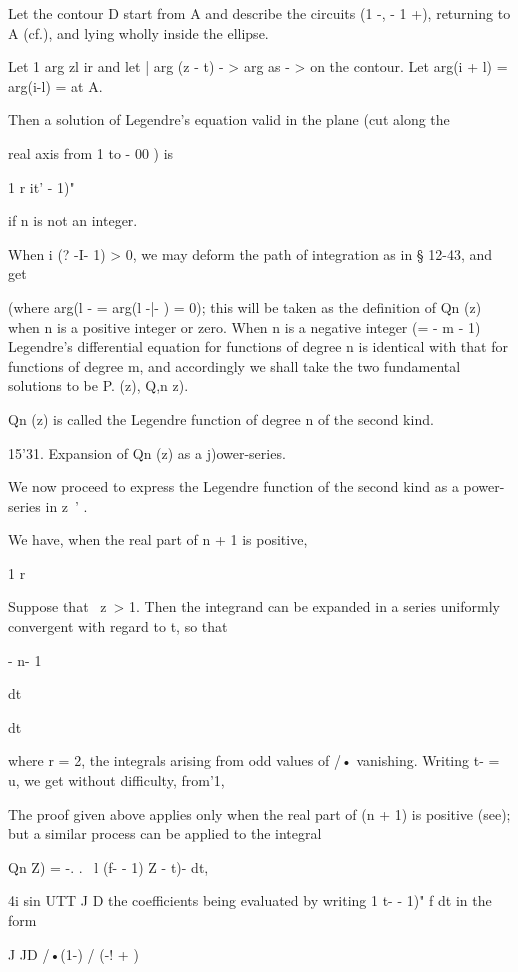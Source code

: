 {{Let the contour D start from A and describe the circuits (1 -, - 1
+), returning to A (cf.), and lying wholly inside the ellipse.

Let 1 arg zl ir and let | arg (z - t) - > arg as - > on the contour.
Let arg(i + l) = arg(i-l) = at A.

Then a solution of Legendre's equation valid in the plane (cut along
the

real axis from 1 to - 00 ) is

1 r it' - 1)"

if n is not an integer.

When i (? -I- 1) > 0, we may deform the path of integration as in §
12-43, and get

(where arg(l - = arg(l -|- ) = 0); this will be taken as the
definition of Qn (z) when n is a positive integer or zero. When n is a
negative integer (= - m - 1) Legendre's differential equation for
functions of degree n is identical with that for functions of degree
m, and accordingly we shall take the two fundamental solutions to be
P. (z), Q,n z).

Qn (z) is called the Legendre function of degree n of the second kind.

%
%

15'31. Expansion of Qn (z) as a j)ower-series.

We now proceed to express the Legendre function of the second kind as
a power-series in z~' .

We have, when the real part of n + 1 is positive,

1 r

Suppose that \ z\ > 1. Then the integrand can be expanded in a series
uniformly convergent with regard to t, so that

- n- 1

dt

dt

where r = 2, the integrals arising from odd values of /• vanishing.
Writing t- = u, we get without difficulty, from'1,

The proof given above applies only when the real part of (n + 1) is
positive (see); but a similar process can be applied to the
integral

Qn Z) = -. . \ l (f- - 1) Z - t)- dt,

4i sin UTT J D the coefficients being evaluated by writing 1 t- - 1)"
f dt in the form

J JD /•(1-) / (-! + )

}}
